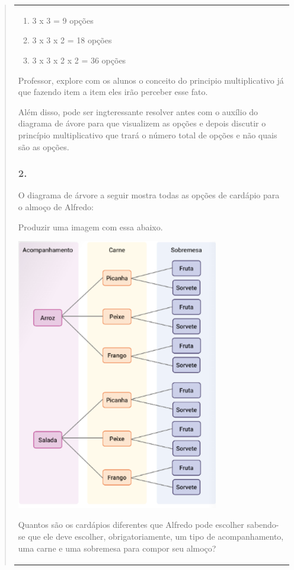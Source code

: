 \begin{enumerate}
\begin{escolha}
\begin{enumerate}
\begin{itemize}
\begin{itemize}
\begin{escolha}
\begin{quote}
\begin{escolha}
{\begin{longtable}[]{@{}l@{}}
\begin{itemize}
\begin{enumerate}
\def\labelenumi{\alph{enumi})}
\item
  3 x 3 = 9 opções
\item
  3 x 3 x 2 = 18 opções
\item
  3 x 3 x 2 x 2 = 36 opções
\end{enumerate}

Professor, explore com os alunos o conceito do principio multiplicativo
já que fazendo item a item eles irão perceber esse fato.

Além disso, pode ser ingteressante resolver antes com o auxílio do
diagrama de ávore para que visualizem as opções e depois discutir o
princípio multiplicativo que trará o número total de opções e não quais
são as opções.

\subsubsection{2.}\label{section-131}

O diagrama de árvore a seguir mostra todas as opções de cardápio para o
almoço de Alfredo:

Produzir uma imagem com essa abaixo.

\includegraphics[width=3.46697in,height=4.68374in]{media/image138.png}

Quantos são os cardápios diferentes que Alfredo pode escolher sabendo-se
que ele deve escolher, obrigatoriamente, um tipo de acompanhamento, uma
carne e uma sobremesa para compor seu almoço?


\end{itemize}
\end{longtable}}
\end{escolha}
\end{quote}
\end{escolha}
\end{itemize}
\end{itemize}
\end{enumerate}
\end{escolha}
\end{enumerate}
